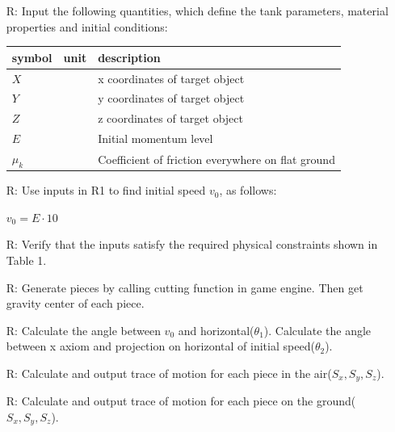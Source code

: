 \documentclass[12pt]{article}
\newcounter{reqnum} %
\begin{document}
\noindent \begin{itemize}

\item[R\refstepcounter{reqnum}\thereqnum \label{R_Inputs}:] 
	Input the following quantities, which define the tank parameters, material properties
	and initial conditions:
	\noindent \begin{longtable*}{l l l} 
		\toprule
		\textbf{symbol} & \textbf{unit} & \textbf{description}\\
		\midrule 
		$X$ & & x coordinates of target object
		\\
		$Y$ & & y coordinates of target object
		\\
		$Z$ & & z coordinates of target object
		\\
		$E$ & & Initial momentum level
		\\
		$\mu_{k}$ & & Coefficient of friction everywhere on flat ground
		\\
		\bottomrule
	\end{longtable*}

\item[R\refstepcounter{reqnum}\thereqnum \label{R_OutputInputs}:] Use inputs in R1 to find initial speed $v_{0}$, as follows:

$v_{0}=E \cdot 10$

\item[R\refstepcounter{reqnum}\thereqnum \label{R_VerifyOutput}:] Verify that the inputs satisfy the required physical constraints shown in Table 1.

\item[R\refstepcounter{reqnum}\thereqnum \label{R_piece}:] Generate pieces by calling cutting function in game engine. Then get gravity center of each piece.

\item[R\refstepcounter{reqnum}\thereqnum \label{R_Calculate}:]
  Calculate the angle between $v_{0}$ and horizontal($\theta _{1}$). Calculate the angle between x axiom and projection on horizontal of initial speed($\theta _{2}$).

\item[R\refstepcounter{reqnum}\thereqnum \label{R_Output1}:] 
  Calculate and output trace of motion for each piece in the air($S_{x},S_{y},S_{z}$).
  
\item[R\refstepcounter{reqnum}\thereqnum \label{R_Output2}:] 
  Calculate and output trace of motion for each piece on the ground($S_{x},S_{y},S_{z}$).

\end{itemize}
\end{document}
